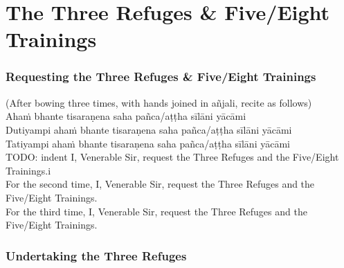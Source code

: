 \chapter{The Three Refuges \& Five/Eight Trainings}

\subsection{Requesting the Three Refuges \& Five/Eight Trainings}

(After bowing three times, with hands joined in añjali, recite as follows)\\

Ahaṁ bhante tisaraṇena saha pañca/aṭṭha sīlāni yācāmi\\
Dutiyampi ahaṁ bhante tisaraṇena saha pañca/aṭṭha sīlāni yācāmi\\
Tatiyampi ahaṁ bhante tisaraṇena saha pañca/aṭṭha sīlāni yācāmi\\

TODO: indent I, Venerable Sir, request the Three Refuges and the Five/Eight Trainings.i\\
For the second time, I, Venerable Sir, request the Three Refuges and the Five/Eight Trainings.\\
For the third time, I, Venerable Sir, request the Three Refuges and the Five/Eight Trainings.

\subsection{Undertaking the Three Refuges}

